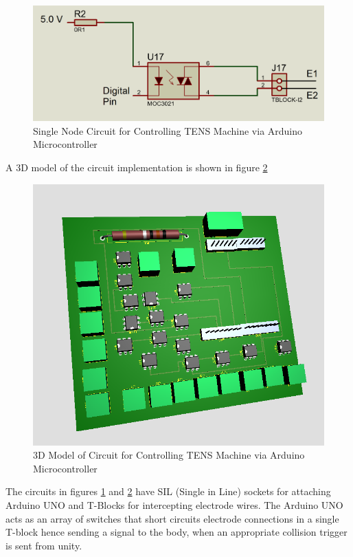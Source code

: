 \begin{figure}
    \centering
    \includegraphics[scale=.5]{images/haptics/oneNodeCircuit.PNG}
    \caption{Single Node Circuit for Controlling TENS Machine via Arduino Microcontroller}
    \label{fig:NodeCircuit}
\end{figure}

A 3D model of the circuit implementation is shown in figure \ref{fig:circuit3d}

\begin{figure}
    \centering
    \includegraphics[scale=0.8]{images/haptics/circuit3D.PNG}
    \caption{3D Model of Circuit for Controlling TENS Machine via Arduino Microcontroller}
    \label{fig:circuit3d}
\end{figure}

The circuits in figures \ref{fig:NodeCircuit} and \ref{fig:circuit3d} have SIL (Single in Line) sockets for attaching Arduino UNO and T-Blocks for intercepting electrode wires. The Arduino UNO acts as an array of switches that short circuits electrode connections in a single T-block hence sending a signal to the body, when an appropriate collision trigger is sent from unity. 

